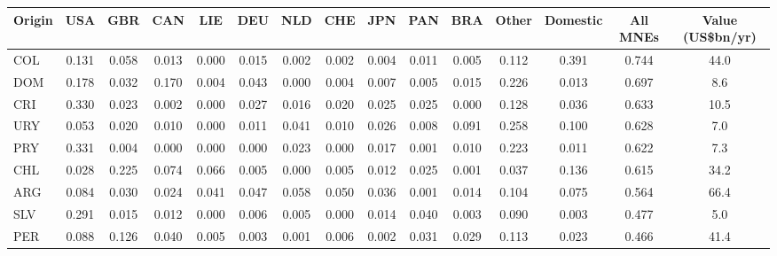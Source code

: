 \begin{tabular}{lcccccccccccccc}
\toprule
Origin & USA & GBR & CAN & LIE & DEU & NLD & CHE & JPN & PAN & BRA & Other & Domestic & All MNEs & Value (US\$bn/yr) \\
\midrule
COL & 0.131 & 0.058 & 0.013 & 0.000 & 0.015 & 0.002 & 0.002 & 0.004 & 0.011 & 0.005 & 0.112 & 0.391 & 0.744 & 44.0 \\
DOM & 0.178 & 0.032 & 0.170 & 0.004 & 0.043 & 0.000 & 0.004 & 0.007 & 0.005 & 0.015 & 0.226 & 0.013 & 0.697 & 8.6 \\
CRI & 0.330 & 0.023 & 0.002 & 0.000 & 0.027 & 0.016 & 0.020 & 0.025 & 0.025 & 0.000 & 0.128 & 0.036 & 0.633 & 10.5 \\
URY & 0.053 & 0.020 & 0.010 & 0.000 & 0.011 & 0.041 & 0.010 & 0.026 & 0.008 & 0.091 & 0.258 & 0.100 & 0.628 & 7.0 \\
PRY & 0.331 & 0.004 & 0.000 & 0.000 & 0.000 & 0.023 & 0.000 & 0.017 & 0.001 & 0.010 & 0.223 & 0.011 & 0.622 & 7.3 \\
CHL & 0.028 & 0.225 & 0.074 & 0.066 & 0.005 & 0.000 & 0.005 & 0.012 & 0.025 & 0.001 & 0.037 & 0.136 & 0.615 & 34.2 \\
ARG & 0.084 & 0.030 & 0.024 & 0.041 & 0.047 & 0.058 & 0.050 & 0.036 & 0.001 & 0.014 & 0.104 & 0.075 & 0.564 & 66.4 \\
SLV & 0.291 & 0.015 & 0.012 & 0.000 & 0.006 & 0.005 & 0.000 & 0.014 & 0.040 & 0.003 & 0.090 & 0.003 & 0.477 & 5.0 \\
PER & 0.088 & 0.126 & 0.040 & 0.005 & 0.003 & 0.001 & 0.006 & 0.002 & 0.031 & 0.029 & 0.113 & 0.023 & 0.466 & 41.4 \\
\bottomrule
\end{tabular}
